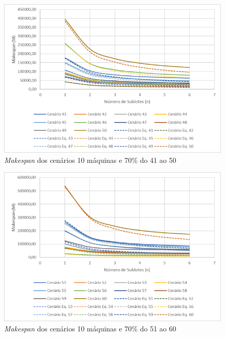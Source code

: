 \begin{figure}[H]
    \centering
     \includegraphics[width=13cm]{Apendices/Figuras/10m70_41-50.png}
     \caption{\textit{Makespan} dos cenários 10 máquinas e 70\% do 41 ao 50}
    \label{fig:10m70_41-50}
\end{figure}

\begin{figure}[H]
    \centering
     \includegraphics[width=13cm]{Apendices/Figuras/10m70_51-60.png}
     \caption{\textit{Makespan} dos cenários 10 máquinas e 70\% do 51 ao 60}
    \label{fig:10m70_51-60}
\end{figure}

